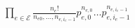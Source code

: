 \documentclass{article}
\begin{document}
$ \prod_{e\in\mathcal{E}} \frac{n_e!}{n_{e0},\dots,n_{e,i_e-1}} p_{e,0}^{n_{e,0}} \dots p_{e,i_e-1}^{n_{e,i_e-1}} $
\pagebreak
\end{document}
